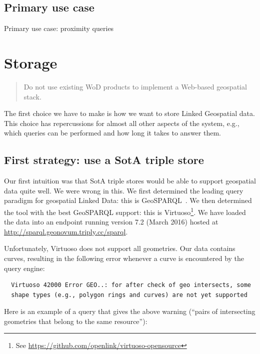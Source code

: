 \documentclass[a4paper]{scrartcl}
\newcommand{\seeUrl}[1]{\footnote{See \mbox{\url{#1}}}}
\begin{document}

\subsection{Primary use case}
\label{sec:use_case}

Primary use case: proximity queries


\section{Storage}
\label{sec:storage}

\begin{quote}
  Do not use existing WoD products to implement a Web-based geospatial
  stack.
\end{quote}

The first choice we have to make is how we want to store Linked
Geospatial data.  This choice has repercussions for almost all other
aspects of the system, e.g., which queries can be performed and how
long it takes to answer them.


\subsection{First strategy: use a SotA triple store}

Our first intuition was that SotA triple stores would be able to
support geospatial data quite well.  We were wrong in this.  We first
determined the leading query paradigm for geospatial Linked Data: this
is GeoSPARQL~\cite{Battle2011}.  We then determined the tool with the
best GeoSPARQL support: this is
Virtuoso\seeUrl{https://github.com/openlink/virtuoso-opensource}.  We
  have loaded the data into an endpoint running version 7.2 (March
  2016) hosted at \url{http://sparql.geonovum.triply.cc/sparql}.

Unfortunately, Virtuoso does not support all geometries.  Our data
contains curves, resulting in the following error whenever a curve is
encountered by the query engine:

\begin{verbatim}
  Virtuoso 42000 Error GEO..: for after check of geo intersects, some
  shape types (e.g., polygon rings and curves) are not yet supported
\end{verbatim}

Here is an example of a query that gives the above warning (``pairs of
intersecting geometries that belong to the same resource''):
\end{document}
